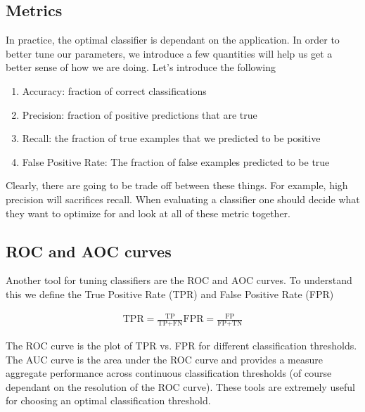 \subsection{Metrics}
In practice, the optimal classifier is dependant on the application. In order to better tune our parameters, we introduce a few quantities will help us get a better sense of how we are doing. Let's introduce the following

\begin{enumerate}
    \item Accuracy: fraction of correct classifications
    \item Precision: fraction of positive predictions that are true
    \item Recall: the fraction of true examples that we predicted to be positive
    \item False Positive Rate: The fraction of false examples predicted to be true
\end{enumerate}

Clearly, there are going to be trade off between these things. For example, high precision will sacrifices recall. When evaluating a classifier one should decide what they want to optimize for and look at all of these metric together.

\subsection{ROC and AOC curves}

Another tool for tuning classifiers are the ROC and AOC curves. To understand this we define the True Positive Rate (TPR) and False Positive Rate (FPR)

\begin{align}
    \text{TPR} = \frac{\text{TP}}{\text{TP} + \text{FN}}
    \text{FPR} = \frac{\text{FP}}{\text{FP} + \text{TN}}
\end{align}

The ROC curve is the plot of TPR vs. FPR for different classification thresholds. The AUC curve is the area under the ROC curve and provides a measure aggregate performance across continuous classification thresholds (of course dependant on the resolution of the ROC curve). These tools are extremely useful for choosing an optimal classification threshold.


